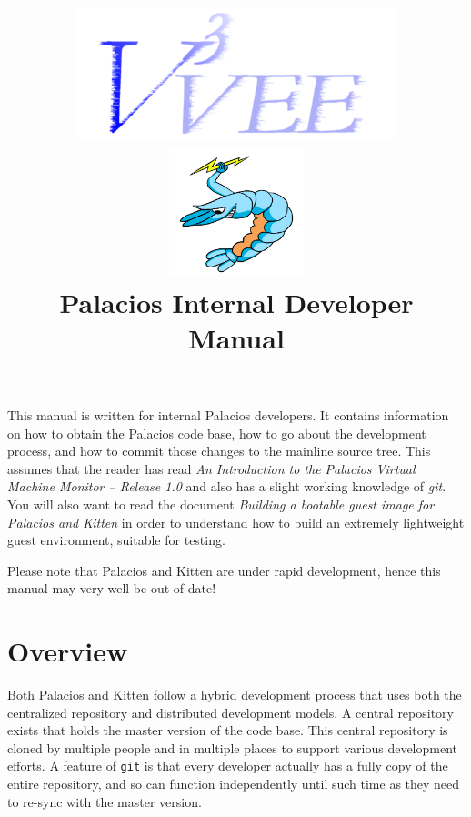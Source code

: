 \documentclass[11pt]{article}
\begin{document}
\title{
\includegraphics[height=1.5in]{v3vee.pdf}
\includegraphics[height=1.5in]{logo6.png} \\
\vspace{0.5in} 
Palacios Internal Developer Manual
}


\maketitle


This manual is written for internal Palacios developers. It contains
information on how to obtain the Palacios code base, how to go about
the development process, and how to commit those changes to the
mainline source tree.  This assumes that the reader has read {\em An
Introduction to the Palacios Virtual Machine Monitor -- Release 1.0}
and also has a slight working knowledge of {\em git}.  You will also
want to read the document {\em Building a bootable guest image for
Palacios and Kitten} in order to understand how to build an extremely
lightweight guest environment, suitable for testing.

Please note that Palacios and Kitten are under rapid development,
hence this manual may very well be out of date!

\newpage
\tableofcontents
\newpage
\listoffigures
\newpage

\section{Overview}


Both Palacios and Kitten follow a hybrid development process that
uses both the centralized repository and distributed development
models. A central repository exists that holds the master version of
the code base. This central repository is cloned by multiple people
and in multiple places to support various development efforts. A
feature of \texttt{git} is that every developer actually has a fully copy of
the entire repository, and so can function independently until such
time as they need to re-sync with the master version. 
\end{document}
